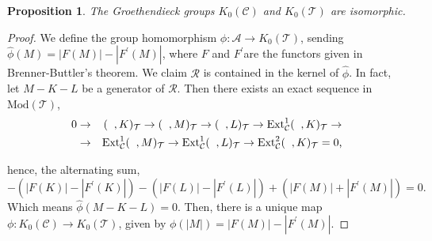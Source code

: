 \documentclass{amsart}
\theoremstyle{plain}
\newtheorem{proposition}{Proposition}
\numberwithin{equation}{section}
\begin{document}
\begin{proposition}
The Groethendieck groups $K_{0}(\mathcal{C})$ and $K_{0}(\mathcal{T})$ are
isomorphic.
\end{proposition}

\begin{proof}
We define the group homomorphism $\hat{\phi}:\mathcal{A}\rightarrow K_{0}(\mathcal{T})$, sending $\hat{\phi}(M)=|F(M)|-|F^{\prime }(M)|$, where $F$
and $F^{\prime }$are the functors given in Brenner-Buttler's theorem. We
claim $\mathcal{R}$ is contained in the kernel of $\hat{\phi}$. In fact, let
$M-K-L$ be a generator of $\mathcal{R}$. Then there exists an exact sequence
in $\mathrm{\mathrm{Mod}}(\mathcal{T})$,
\begin{eqnarray}
0 &\rightarrow &(\;\;,K)_{\mathcal{T}}\rightarrow (\;\;,M)_{\mathcal{T}}\rightarrow (\;\;,L)_{\mathcal{T}}\rightarrow \mathrm{Ext}_{\mathcal{C}}^{1}(\;\;,K)_{\mathcal{T}}\rightarrow  \notag  \label{GG1} \\
&\rightarrow &\mathrm{Ext}_{\mathcal{C}}^{1}(\;\;,M)_{\mathcal{T}}\rightarrow \mathrm{Ext}_{\mathcal{C}}^{1}(\;\;,L)_{\mathcal{T}}\rightarrow
\mathrm{Ext}_{\mathcal{C}}^{2}(\;\;,K)_{\mathcal{T}}=0\text{,}
\end{eqnarray}

hence, the alternating sum,
\begin{equation*}
-(|F(K)|-|F^{\prime }(K)|)-(|F(L)|-|F^{\prime }(L)|)+(|F(M)|+|F^{\prime
}(M)|)=0.
\end{equation*}Which means $\hat{\phi}(M-K-L)=0$. Then, there is a unique map $\phi :K_{0}(\mathcal{C})\rightarrow K_{0}(\mathcal{T})$, given by $\phi
(|M|)=|F(M)|-|F^{\prime }(M)|$.


\end{proof}
\end{document}
